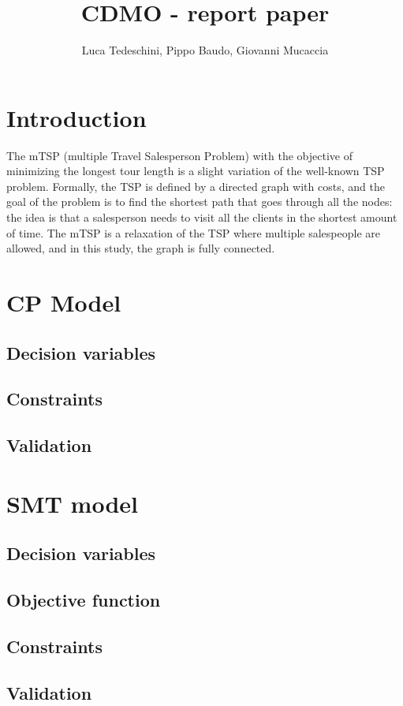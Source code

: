 \documentclass{article}
\title{CDMO - report paper}
\author{Luca Tedeschini, Pippo Baudo, Giovanni Mucaccia}
\begin{document}
\maketitle


\section{Introduction}
The mTSP (multiple Travel Salesperson Problem) with the objective of minimizing the longest tour length is a slight variation of the well-known TSP problem. Formally, the TSP is defined by a directed graph with costs, and the goal of the problem is to find the shortest path that goes through all the nodes: the idea is that a salesperson needs to visit all the clients in the shortest amount of time. The mTSP is a relaxation of the TSP where multiple salespeople are allowed, and in this study, the graph is fully connected.

\section{CP Model}
\subsection{Decision variables}
\subsection{Constraints}
\subsection{Validation}
\section{SMT model}
\subsection{Decision variables}
\subsection{Objective function}
\subsection{Constraints}
\subsection{Validation}
\end{document}
